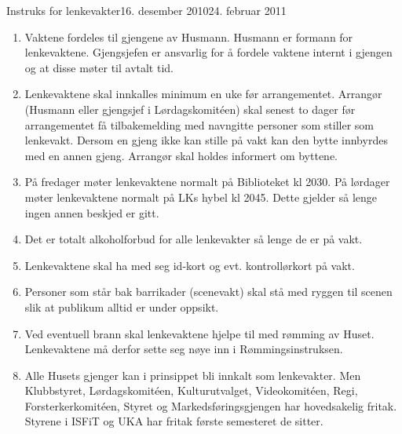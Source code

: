 \begin{instruks}{Instruks for lenkevakter}{16. desember 2010}{24. februar 2011}

    \begin{enumerate}
        \item Vaktene fordeles til gjengene av Husmann. Husmann er formann for
            lenkevaktene. Gjengsjefen er ansvarlig
            for å fordele vaktene internt i gjengen og at disse møter til avtalt tid.
        \item Lenkevaktene skal innkalles minimum en uke før arrangementet. Arrangør
            (Husmann eller gjengsjef i
            Lørdagskomit\'een) skal senest to dager før arrangementet få tilbakemelding med
            navngitte personer som
            stiller som lenkevakt. Dersom en gjeng ikke kan stille på vakt kan den bytte
            innbyrdes med en annen gjeng.
            Arrangør skal holdes informert om byttene.
        \item På fredager møter lenkevaktene normalt på Biblioteket kl 2030. På lørdager
            møter lenkevaktene normalt på
            LKs hybel kl 2045. Dette gjelder så lenge ingen annen beskjed er gitt.
        \item Det er totalt alkoholforbud for alle lenkevakter så lenge de er på vakt.
        \item Lenkevaktene skal ha med seg id-kort og evt. kontrollørkort på vakt.
        \item Personer som står bak barrikader (scenevakt) skal stå med ryggen til scenen
            slik at publikum alltid er under oppsikt.
        \item Ved eventuell brann skal lenkevaktene hjelpe til med rømming av Huset.
            Lenkevaktene må derfor sette seg nøye inn i Rømmingsinstruksen.
        \item Alle Husets gjenger kan i prinsippet bli innkalt som lenkevakter. Men
            Klubbstyret, Lørdagskomit\'een, Kulturutvalget, Videokomit\'een, Regi,
            Forsterkerkomit\'een, Styret og Markedsføringsgjengen har hovedsakelig fritak. 
            Styrene i ISFiT og UKA har fritak første semesteret de sitter.
    \end{enumerate}
\end{instruks}




